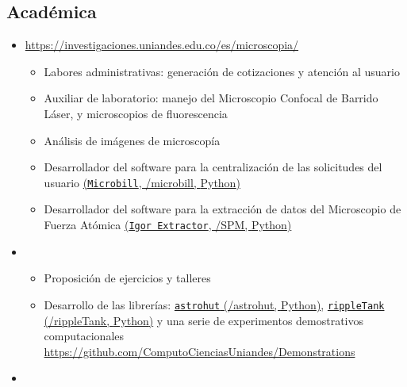 \documentclass[11pt, letterpaper, sans]{moderncv}        %
\begin{document}
	\subsection{Acad\'emica}
		\begin{itemize}
			\item
			{
				{
					\url{https://investigaciones.uniandes.edu.co/es/microscopia/}
					\vspace{3pt}
					\begin{itemize}
						\item Labores administrativas: generación de cotizaciones y atención al usuario
						\item Auxiliar de laboratorio: manejo del Microscopio Confocal de Barrido Láser, y microscopios de fluorescencia
						\item Análisis de imágenes de microscopía
						\item Desarrollador del software para la centralización de las solicitudes del usuario \href{https://github.com/jsbarbosa/microbill}{(\texttt{Microbill}, \faGithub/microbill, {\color{blue} Python})}
						\item Desarrollador del software para la extracci\'on de datos del Microscopio de Fuerza Atómica
						\href{https://github.com/jsbarbosa/SPM}{(\texttt{Igor Extractor}, \faGithub/SPM, {\color{blue} Python})}
					\end{itemize}
				}
			}
			\item
			{
				{
					\vspace{3pt}
					\begin{itemize}
						\item Proposición de ejercicios y talleres
						\item Desarrollo de las librerías: \href{https://github.com/jsbarbosa/astrohut}{\texttt{astrohut} (\faGithub/astrohut, {\color{blue} Python})},  \href{https://github.com/jsbarbosa/rippleTank}{\texttt{rippleTank} (\faGithub/rippleTank, {\color{blue} Python})} y una serie de experimentos demostrativos computacionales \url{https://github.com/ComputoCienciasUniandes/Demonstrations}
					\end{itemize} 
				}
			}
			\vspace{6pt}
			\item
			{
}
\end{itemize}
\end{document}
